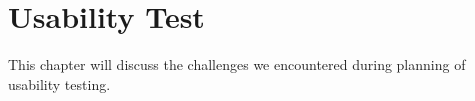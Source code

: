 \chapter{Usability Test}\label{cha:usability}
This chapter will discuss the challenges we encountered during planning of usability testing.
